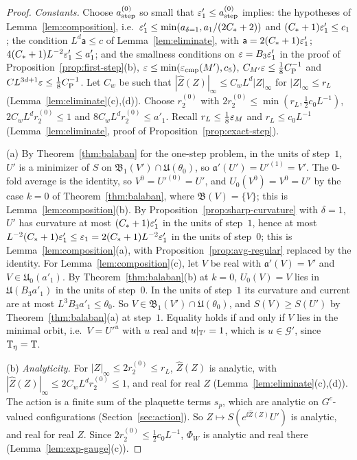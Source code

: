 \begin{proof}
\emph{Constants.} Choose $a^{(0)}_{\rm step}$ so small that $\varepsilon'_1\le a^{(0)}_{\rm step}$ implies: the hypotheses of Lemma~\ref{lem:composition}, i.e.\ $\varepsilon'_1\le\min(a_{\delta=1},a_1/(2C_*+2))$ and $(C_*+1)\varepsilon'_1\le c_1$; the condition $L^d\mathsf a\le c$ of Lemma~\ref{lem:eliminate}, with $\mathsf a=2(C_*+1)\varepsilon'_1$; $4(C_*+1)L^{-2}\varepsilon'_1\le a'_1$; and the smallness conditions on $\varepsilon=B_3\varepsilon'_1$ in the proof of Proposition~\ref{prop:first-step}(b), $\varepsilon\le\min(\varepsilon_{\rm cmp}(M'),c_5)$, $C_{M'}\varepsilon\le\frac18C_{\rm P}^{-1}$ and $CL^{3d+1}\varepsilon\le\frac18C_{\rm P}^{-1}$. Let $C_w$ be such that $|\hat Z(Z)|_\infty\le C_wL^d|Z|_\infty$ for $|Z|_\infty\le r_L$ (Lemma~\ref{lem:eliminate}(c),(d)). Choose $r^{(0)}_2$ with $2r^{(0)}_2\le\min(r_L,\frac12c_0L^{-1})$, $2C_wL^dr^{(0)}_2\le1$ and $8C_wL^dr^{(0)}_2\le a'_1$. Recall $r_L\le\frac18\varepsilon_M$ and $r_L\le c_0L^{-1}$ (Lemma~\ref{lem:eliminate}, proof of Proposition~\ref{prop:exact-step}).

(a) By Theorem~\ref{thm:balaban} for the one-step problem, in the units of step~$1$, $U'$ is a minimizer of $S$ on $\mathfrak B_1(V')\cap\mathfrak U(\theta_0)$, so $\mathfrak a'(U')=U'^{(1)}=V'$. The $0$-fold average is the identity, so $V^0=U'^{(0)}=U'$, and $U_0(V^0)=V^0=U'$ by the case $k=0$ of Theorem~\ref{thm:balaban}, where $\mathfrak B(V)=\{V\}$; this is Lemma~\ref{lem:composition}(b). By Proposition~\ref{prop:sharp-curvature} with $\delta=1$, $U'$ has curvature at most $(C_*+1)\varepsilon'_1$ in the units of step~$1$, hence at most $L^{-2}(C_*+1)\varepsilon'_1\le\varepsilon_1=2(C_*+1)L^{-2}\varepsilon'_1$ in the units of step~$0$; this is Lemma~\ref{lem:composition}(a), with Proposition~\ref{prop:avg-regular} replaced by the identity. For Lemma~\ref{lem:composition}(c), let $V$ be real with $\mathfrak a'(V)=V'$ and $V\in\mathfrak U_0(a'_1)$. By Theorem~\ref{thm:balaban}(b) at $k=0$, $U_0(V)=V$ lies in $\mathfrak U(B_3a'_1)$ in the units of step~$0$. In the units of step~$1$ its curvature and current are at most $L^3B_3a'_1\le\theta_0$. So $V\in\mathfrak B_1(V')\cap\mathfrak U(\theta_0)$, and $S(V)\ge S(U')$ by Theorem~\ref{thm:balaban}(a) at step~$1$. Equality holds if and only if $V$ lies in the minimal orbit, i.e.\ $V=U'^u$ with $u$ real and $u|_{\mathbb T'}=1$, which is $u\in\mathcal G'$, since $\mathbb T_\eta=\mathbb T$.

(b) \emph{Analyticity.} For $|Z|_\infty\le2r^{(0)}_2\le r_L$, $\hat Z(Z)$ is analytic, with $|\hat Z(Z)|_\infty\le2C_wL^dr^{(0)}_2\le1$, and real for real $Z$ (Lemma~\ref{lem:eliminate}(c),(d)). The action is a finite sum of the plaquette terms $s_p$, which are analytic on $G^c$-valued configurations (Section~\ref{sec:action}). So $Z\mapsto S(e^{\ii\hat Z(Z)}U')$ is analytic, and real for real $Z$. Since $2r^{(0)}_2\le\frac12c_0L^{-1}$, $\Phi_W$ is analytic and real there (Lemma~\ref{lem:exp-gauge}(c)).


\end{proof}
